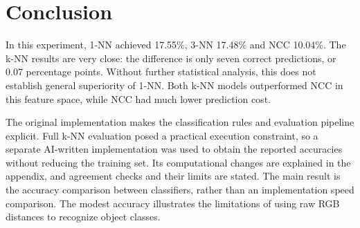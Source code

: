 \section{Conclusion}
In this experiment, 1-NN achieved 17.55\%, 3-NN 17.48\% and NCC 10.04\%.
The k-NN results are very close: the difference is only seven correct
predictions, or 0.07 percentage points. Without further statistical
analysis, this does not establish general superiority of 1-NN.
Both k-NN models outperformed NCC in this feature space, while NCC had
much lower prediction cost.

The original implementation makes the classification rules and evaluation
pipeline explicit. Full k-NN evaluation posed a practical execution constraint,
so a separate AI-written implementation was used to obtain the reported
accuracies without reducing the training set. Its computational changes are
explained in the appendix, and agreement checks and their limits are stated.
The main result is the accuracy comparison between classifiers, rather than
an implementation speed comparison. The modest accuracy illustrates the
limitations of using raw RGB distances to recognize object classes.
